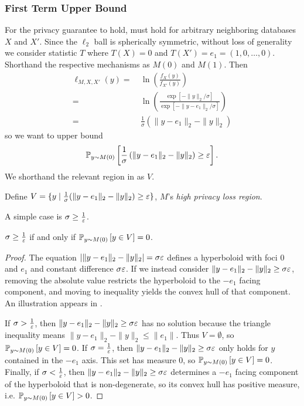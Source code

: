 \subsubsection{First Term Upper Bound}
\label{subsubsec:ub}
For the privacy guarantee to hold,  must hold for arbitrary neighboring databases $X$ and $X'$. Since the $\ell_2$ ball is spherically symmetric, without loss of generality we consider statistic $T$ where $T(X) = 0$ and $T(X') = e_1 = (1, 0, \ldots, 0)$. Shorthand the respective mechanisms as $M(0)$ and $M(1)$. Then
\begin{align*}
    \ell_{M,X,X'}(y) =&\ \ln\left(\frac{f_X(y)}{f_{X'}(y)}\right) \\
    =&\ \ln\left(\frac{\exp[-\|y\|_2 / \sigma]}{\exp[-\|y - e_1\|_2 / \sigma]}\right) \\
    =&\ \frac{1}{\sigma}\left(\|y-e_1\|_2 - \|y\|_2\right)
\end{align*}
so we want to upper bound
\begin{equation}
\label{eq:plrv_1_ub}
    \P{y \sim M(0)}{\frac{1}{\sigma}\left(\|y-e_1\|_2 - \|y\|_2\right) \geq \eps}.
\end{equation}
We shorthand the relevant region in  as $V$.
\begin{definition}
\label{def:V}
    Define $V = \{y \mid \frac{1}{\sigma}(\|y-e_1\|_2 - \|y\|_2) \geq \eps\}$, $M$'s \emph{high privacy loss region}.
\end{definition}
A simple case is $\sigma \geq \frac{1}{\eps}$.
\begin{lemma}
\label{lem:large_sigma}
    $\sigma \geq \frac{1}{\eps}$ if and only if $\P{y \sim M(0)}{y \in V} = 0$.
\end{lemma}
\begin{proof}
    The equation $|\|y - e_1\|_2 - \|y\|_2| = \sigma\eps$ defines a hyperboloid with foci $0$ and $e_1$ and constant difference $\sigma\eps$. If we instead consider $\|y - e_1\|_2 - \|y\|_2 \geq \sigma\eps$, removing the absolute value restricts the hyperboloid to the $-e_1$ facing component, and moving to inequality yields the convex hull of that component. An illustration appears in .
    
    If $\sigma > \frac{1}{\eps}$, then $\|y-e_1\|_2 - \|y\|_2 \geq \sigma \eps$ has no solution because the triangle inequality means $\|y-e_1\|_2 - \|y\|_2 \leq \|e_1\|$. Thus $V = \emptyset$, so $\P{y \sim M(0)}{y \in V} = 0$. If $\sigma = \frac{1}{\eps}$, then $\|y-e_1\|_2 - \|y\|_2 \geq \sigma \eps$ only holds for $y$ contained in the $-e_1$ axis. This set has measure 0, so $\P{y \sim M(0)}{y \in V} = 0$. Finally, if $\sigma < \frac{1}{\eps}$, then $\|y - e_1\|_2 - \|y\|_2 \geq \sigma\eps$ determines a $-e_1$ facing component of the hyperboloid that is non-degenerate, so its convex hull has positive measure, i.e. $\P{y \sim M(0)}{y \in V} > 0$.
\end{proof}

